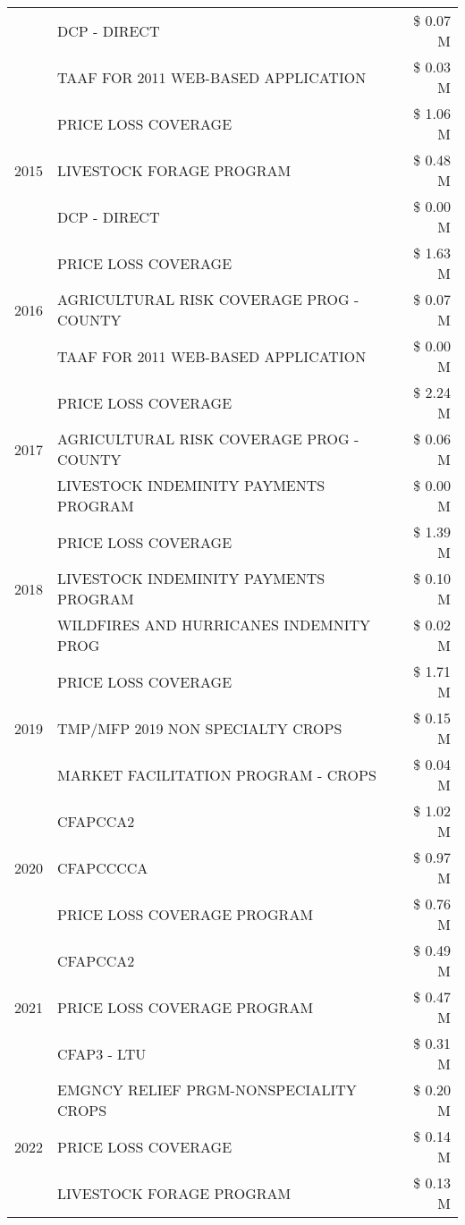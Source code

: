 \begin{tabular}{llr}
 & DCP - DIRECT & \$ 0.07 M \\
 & TAAF FOR 2011 WEB-BASED APPLICATION & \$ 0.03 M \\
\cline{1-3}
\multirow[t]{3}{*}{2015} & PRICE LOSS COVERAGE & \$ 1.06 M \\
 & LIVESTOCK FORAGE PROGRAM & \$ 0.48 M \\
 & DCP - DIRECT & \$ 0.00 M \\
\cline{1-3}
\multirow[t]{3}{*}{2016} & PRICE LOSS COVERAGE & \$ 1.63 M \\
 & AGRICULTURAL RISK COVERAGE PROG - COUNTY & \$ 0.07 M \\
 & TAAF FOR 2011 WEB-BASED APPLICATION & \$ 0.00 M \\
\cline{1-3}
\multirow[t]{3}{*}{2017} & PRICE LOSS COVERAGE & \$ 2.24 M \\
 & AGRICULTURAL RISK COVERAGE PROG - COUNTY & \$ 0.06 M \\
 & LIVESTOCK INDEMINITY PAYMENTS PROGRAM & \$ 0.00 M \\
\cline{1-3}
\multirow[t]{3}{*}{2018} & PRICE LOSS COVERAGE & \$ 1.39 M \\
 & LIVESTOCK INDEMINITY PAYMENTS PROGRAM & \$ 0.10 M \\
 & WILDFIRES AND HURRICANES INDEMNITY PROG & \$ 0.02 M \\
\cline{1-3}
\multirow[t]{3}{*}{2019} & PRICE LOSS COVERAGE & \$ 1.71 M \\
 & TMP/MFP 2019 NON SPECIALTY CROPS & \$ 0.15 M \\
 & MARKET FACILITATION PROGRAM - CROPS & \$ 0.04 M \\
\cline{1-3}
\multirow[t]{3}{*}{2020} & CFAPCCA2 & \$ 1.02 M \\
 & CFAPCCCCA & \$ 0.97 M \\
 & PRICE LOSS COVERAGE PROGRAM & \$ 0.76 M \\
\cline{1-3}
\multirow[t]{3}{*}{2021} & CFAPCCA2 & \$ 0.49 M \\
 & PRICE LOSS COVERAGE PROGRAM & \$ 0.47 M \\
 & CFAP3 - LTU & \$ 0.31 M \\
\cline{1-3}
\multirow[t]{3}{*}{2022} & EMGNCY RELIEF PRGM-NONSPECIALITY CROPS & \$ 0.20 M \\
 & PRICE LOSS COVERAGE & \$ 0.14 M \\
 & LIVESTOCK FORAGE PROGRAM & \$ 0.13 M \\
\cline{1-3}
\bottomrule
\end{tabular}
